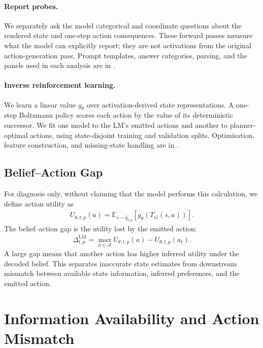 \documentclass{article}
\begin{document}
\paragraph{Report probes.}
We separately ask the model categorical and coordinate questions about the rendered state and one-step action consequences. These forward passes measure what the model can explicitly report; they are not activations from the original action-generation pass. Prompt templates, answer categories, parsing, and the panels used in each analysis are in .

\paragraph{Inverse reinforcement learning.}\label{sec:estimating-values}
We learn a linear value $g_\theta$ over activation-derived state representations. A one-step Boltzmann policy scores each action by the value of its deterministic successor. We fit one model to the LM's emitted actions and another to planner-optimal actions, using state-disjoint training and validation splits. Optimisation, feature construction, and missing-state handling are in .

\subsection{Belief--Action Gap}\label{sec:belief-action-gap}
For diagnosis only, without claiming that the model performs this calculation, we define action utility as
\begin{align}
U_{\theta,t,p}(a)=\mathbb{E}_{s\sim \hat q_{t,p}}\!\left[g_\theta(T_G(s,a))\right].
\label{eq:expected-action-preference}
\end{align}
The belief--action gap is the utility lost by the emitted action:
\begin{align}
\Delta_{t,p}^{\mathrm{LM}}=\max_{a\in\mathcal A}U_{\theta,t,p}(a)-U_{\theta,t,p}(a_t).
\label{eq:belief-action-gap}
\end{align}
A large gap means that another action has higher inferred utility under the decoded belief. This separates inaccurate state estimates from downstream mismatch between available state information, inferred preferences, and the emitted action.


\section{Information Availability and Action Mismatch}
\label{sec:analysis1}
\end{document}
